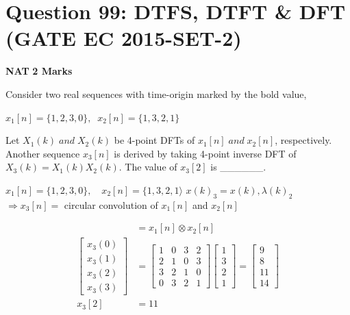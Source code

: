 \documentclass[11pt,a4paper]{article}
\begin{document}
\section*{Question 99: DTFS, DTFT \& DFT (GATE EC 2015-SET-2)}
\noindent \textbf{\color{primary}NAT} \hfill \textbf{\color{secondary}2 Marks}


\noindent Consider two real sequences with time-origin marked by the bold value,

 $x_{1}[n]=\{1,2,3,0\}, \; \; x_{2}[n]=\{1,3,2,1\}$

 Let $X_{1}(k) \; and \; X_{2}(k)$ be 4-point DFTs of $x_{1}[n] \; and \;  x_{2}[n]$, respectively. 
 Another sequence $x_{3}[n]$ is derived by taking 4-point inverse DFT of $X_{3}(k) =X_{1}(k)X_{2}(k)$. 
 The value of $x_{3}[2]$ is \_\_\_\_\_\_.


\begin{tcolorbox}[solbox, title=Detailed Solution -- Question 99]
$x_{1}[n]=\{1,2,3,0\}, \quad x_{2}[n]=\{1,3,2,1\rangle$
$x(k)_{3}=x(k), \lambda(k)_{2}$
$\Rightarrow x_{3}[n]=$ circular convolution of $x_{1}[n]$ and $x_{2}[n]$

\[
\begin{aligned} &=x_{1}[n] \otimes x_{2}[n] \\ \left[\begin{array}{l}x_{3}(0) \\ x_{3}(1) \\ x_{3}(2) \\ x_{3}(3)\end{array}\right]&=\left[\begin{array}{llll}1 & 0 & 3 & 2 \\ 2 & 1 & 0 & 3 \\ 3 & 2 & 1 & 0 \\ 0 & 3 & 2 & 1\end{array}\right]\left[\begin{array}{l}1 \\ 3 \\ 2 \\ 1\end{array}\right]=\left[\begin{array}{c}9 \\ 8 \\ 11 \\ 14\end{array}\right] \\ x_{3}[2]&=11 \end{aligned}
\]
\end{tcolorbox}
\end{document}
